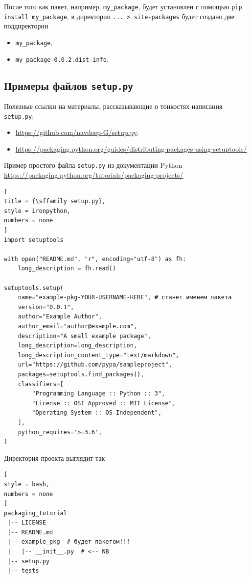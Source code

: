 \documentclass[%
	11pt,
	a4paper,
	utf8,
		]{article}
\begin{document}
После того как пакет, например, \texttt{my\_package}, будет установлен с помощью \texttt{pip install my\_package}, в директории \texttt{... > site-packages} будет создано две поддиректории
\begin{itemize}
	\item \texttt{my\_package},
	
	\item \texttt{my\_package-0.0.2.dist-info}.
\end{itemize}





\subsection{Примеры файлов \texttt{setup.py}}

Полезные ссылки на материалы, рассказывающие о тонкостях написания \texttt{setup.py}: 
\begin{itemize}
	\item \url{https://github.com/navdeep-G/setup.py},
	
	\item \url{https://packaging.python.org/guides/distributing-packages-using-setuptools/}
\end{itemize}

Пример простого файла \texttt{setup.py} из документации Python \url{https://packaging.python.org/tutorials/packaging-projects/}
\begin{lstlisting}[
title = {\sffamily setup.py},
style = ironpython,
numbers = none	
]
import setuptools

with open("README.md", "r", encoding="utf-8") as fh:
    long_description = fh.read()

setuptools.setup(
    name="example-pkg-YOUR-USERNAME-HERE", # станет именем пакета
    version="0.0.1",
    author="Example Author",
    author_email="author@example.com",
    description="A small example package",
    long_description=long_description,
    long_description_content_type="text/markdown",
    url="https://github.com/pypa/sampleproject",
    packages=setuptools.find_packages(),
    classifiers=[
        "Programming Language :: Python :: 3",
        "License :: OSI Approved :: MIT License",
        "Operating System :: OS Independent",
    ],
    python_requires='>=3.6',
)
\end{lstlisting}

Директория проекта выглядит так
\begin{lstlisting}[
style = bash,
numbers = none	
]
packaging_tutorial
 |-- LICENSE
 |-- README.md
 |-- example_pkg  # будет пакетом!!!
 |   |-- __init__.py  # <-- NB
 |-- setup.py
 |-- tests
\end{lstlisting}
\end{document}
